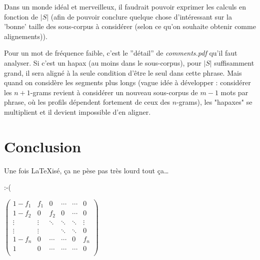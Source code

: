 \documentclass{article}
\begin{document}
Dans un monde idéal et merveilleux, il faudrait pouvoir exprimer les calculs en fonction de $|S|$ (afin de pouvoir conclure quelque chose d'intéressant sur la 'bonne' taille des sous-corpus à considérer (selon ce qu'on souhaite obtenir comme alignements)).

Pour un mot de fréquence faible, c'est le ''détail'' de \emph{comments.pdf} qu'il faut analyser. Si c'est un hapax (au moins dans le sous-corpus), pour $|S|$ suffisamment grand, il sera aligné à la seule condition d'\^etre le seul dans cette phrase. Mais quand on considère les segments plus longs (vague idée à développer : considérer les $n+1$-grams revient à considérer un nouveau sous-corpus de $m-1$ mots par phrase, où les profils dépendent fortement de ceux des $n$-grams), les "hapaxes" se multiplient et il devient impossible d'en aligner.

\section{Conclusion}

Une fois \LaTeX{}isé, ça ne pèse pas très lourd tout ça\dots

:-(

$
\begin{pmatrix}
   1-f_1 & f_1 & 0 & \cdots & \cdots & 0 \\
   1-f_2 & 0 & f_2 & 0 & \cdots & 0 \\
   \vdots & \vdots & \ddots & \ddots & \ddots & \vdots \\
   \vdots & \vdots &  & \ddots & \ddots  & 0 \\
   1-f_n & 0 & \cdots & \cdots & 0 & f_n \\
   1 & 0 & \cdots & \cdots & \cdots & 0 \\
\end{pmatrix}
$
\end{document}
